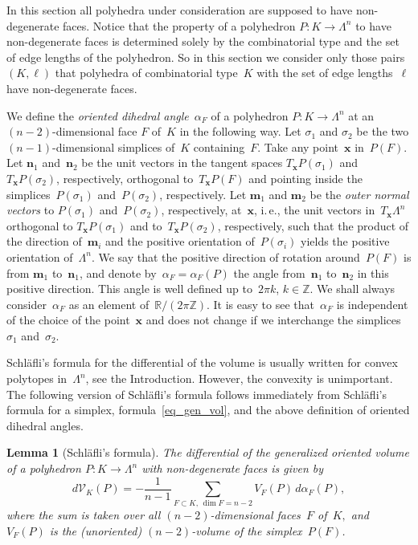 \documentclass[reqno,tbtags,12pt]{amsart}
\numberwithin{equation}{section}
\newcommand{\R}{\mathbb{R}}
\newcommand{\Z}{\mathbb{Z}}
\newcommand{\CV}{\mathcal{V}}
\newcommand{\bx}{\mathbf{x}}
\newcommand{\bm}{\mathbf{m}}
\newcommand{\bn}{\mathbf{n}}
\newcommand{\bell}{\boldsymbol{\ell}}
\newtheorem{lem}[theorem]{Lemma}
\theoremstyle{definition}
\begin{document}
In this section all polyhedra under consideration are supposed to have non-degenerate faces. Notice that the property of a polyhedron $P\colon K\to\Lambda^n$ to have non-degenerate faces is determined solely by the combinatorial type and the set of edge lengths of the polyhedron. So in this section we consider only those pairs $(K,\bell)$ that polyhedra of combinatorial type~$K$ with the set of edge lengths~$\bell$ have non-degenerate faces.



We define the \textit{oriented dihedral angle\/}~$\alpha_F$ of a polyhedron $ P\colon K\to \Lambda^n$  at an $(n-2)$-dimensional face $F$ of~$K$ in the following way. Let $\sigma_1$ and $\sigma_2$ be the two $(n-1)$-dimensional simplices of~$K$ containing~$F$. Take any point~$\bx$ in~$ P(F)$. Let $\bn_1$ and~$\bn_2$ be the unit vectors in the tangent spaces $T_{\bx} P(\sigma_1)$ and~$T_{\bx} P(\sigma_2)$, respectively, orthogonal to~$T_{\bx} P(F)$ and pointing inside the simplices~$ P(\sigma_1)$ and~$ P(\sigma_2)$, respectively. Let $\bm_1$ and $\bm_2$ be the \textit{outer normal vectors\/} to $ P(\sigma_1)$ and~$ P(\sigma_2)$, respectively, at~$\bx$, i.\,e., the unit vectors in~$T_{\bx}\Lambda^n$ orthogonal to $T_{\bx} P(\sigma_1)$ and to~$T_{\bx} P(\sigma_2)$, respectively, such that the product of the direction of~$\bm_i$ and the positive orientation of~$ P(\sigma_i)$ yields the positive orientation of~$\Lambda^n$. We say that the positive direction of rotation around~$ P(F)$ is from $\bm_1$ to~$\bn_1$, and denote by~$\alpha_F=\alpha_F( P)$ the angle from~$\bn_1$ to~$\bn_2$ in this positive direction. This angle is well defined up to~$2\pi k$, $k\in\Z$. We shall always consider~$\alpha_F$ as an element of~$\R/(2\pi\Z)$. It is easy to see that~$\alpha_F$ is independent of the choice of the point~$\bx$ and does not change if we interchange the simplices~$\sigma_1$ and~$\sigma_2$.

Schl\"afli's formula for the differential of the volume is usually written for convex polytopes in~$\Lambda^n$, see the Introduction.
However, the convexity is unimportant. The following version of Schl\"afli's formula follows immediately from Schl\"afli's formula for a simplex, formula~\eqref{eq_gen_vol}, and the above definition of oriented dihedral angles.

\begin{lem}[Schl\"afli's formula]\label{lem_Schlaefli}
The differential of the generalized oriented volume of a polyhedron $ P\colon K\to\Lambda^n$ with non-degenerate faces is given by
\begin{equation}\label{eq_Sch_or}
d \CV_K( P)=-\frac{1}{n-1}\sum_{F\subset K,\,\dim F=n-2}V_F( P)\,d\alpha_F( P),
\end{equation}
where the sum is taken over all\/ $(n-2)$-dimensional faces~$F$ of\/~$K,$ and\/ $V_F(P)$ is the \textnormal{(}unoriented\textnormal{)} $(n-2)$-volume of the simplex~$ P(F)$.
\end{lem}
\end{document}
